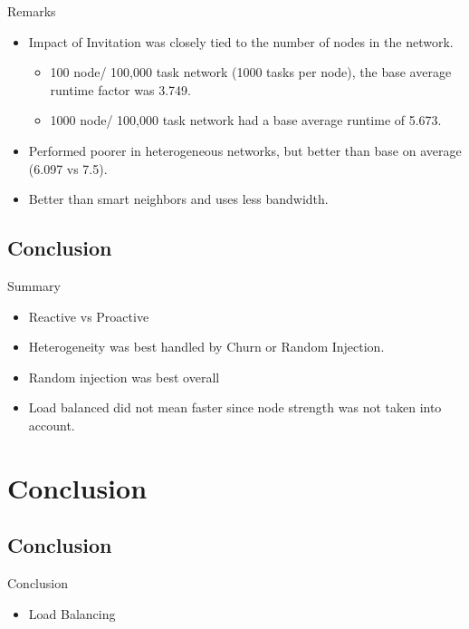 \documentclass[11pt]{beamer}
\begin{document}
\begin{frame}{Remarks}
	\begin{itemize}
		\item Impact of Invitation was closely tied to the number of nodes in the network.
		\begin{itemize}
			\item 100 node/ 100,000 task network (1000 tasks per node), the base average runtime factor was 3.749.
			\item 1000 node/ 100,000 task network had a base average runtime of 5.673.
		\end{itemize}
		\item Performed poorer in heterogeneous networks, but better than base on average (6.097 vs 7.5).
		\item Better than smart neighbors and uses less bandwidth.
	\end{itemize}
\end{frame}

\subsection{Conclusion}

\begin{frame}{Summary}
	\begin{itemize}
		
		\item Reactive vs Proactive
		\item Heterogeneity was best handled by Churn or Random Injection.
		\item Random injection was best overall
		\item Load balanced did not mean faster since node strength was not taken into account.
	\end{itemize}
\end{frame}

\section{Conclusion}

\subsection{Conclusion}

\begin{frame}{Conclusion}
	\begin{itemize}
		
		\item Load Balancing
	\end{itemize}
\end{frame}
\end{document}
